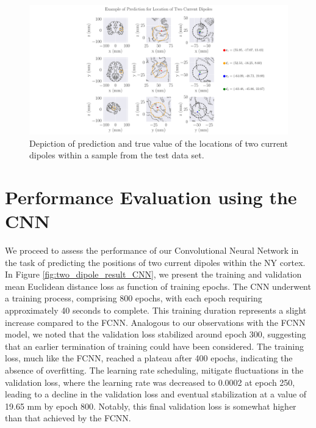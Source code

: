\documentclass[a4paper, UKenglish, 11pt]{uiomaster}
\begin{document}
\begin{figure}[!htb]
  \hspace*{-4.5cm}
    \centering
    \includegraphics[width=20cm]{figures/NN_two_dipole/two_dipoles_prediction.pdf}
    \caption{Depiction of prediction and true value of the locations of two current dipoles within a sample from the test data set.}
    \label{fig:two_dipole_result}
\end{figure}

\FloatBarrier


\section{Performance Evaluation using the CNN}
We proceed to assess the performance of our Convolutional Neural Network in the task of predicting the positions of two current dipoles within the NY cortex. In Figure \ref{fig:two_dipole_result_CNN}, we present the training and validation mean Euclidean distance loss as function of training epochs. The CNN underwent a training process, comprising 800 epochs, with each epoch requiring approximately 40 seconds to complete. This training duration represents a slight increase compared to the FCNN. Analogous to our observations with the FCNN model, we noted that the validation loss stabilized around epoch 300, suggesting that an earlier termination of training could have been considered. The training loss, much like the FCNN, reached a plateau after 400 epochs, indicating the absence of overfitting. The learning rate scheduling, mitigate fluctuations in the validation loss, where the learning rate was decreased to 0.0002 at epoch 250, leading to a decline in the validation loss and eventual stabilization at a value of 19.65 mm by epoch 800. Notably, this final validation loss is somewhat higher than that achieved by the FCNN.
\end{document}
